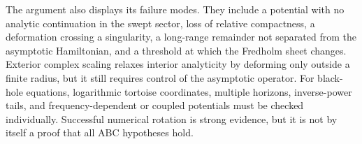 The argument also displays its failure modes.  They include a potential with
no analytic continuation in the swept sector, loss of relative compactness,
a deformation crossing a singularity, a long-range remainder not separated
from the asymptotic Hamiltonian, and a threshold at which the Fredholm sheet
changes.  Exterior complex scaling relaxes interior analyticity by deforming
only outside a finite radius, but it still requires control of the asymptotic
operator.  For black-hole equations, logarithmic tortoise coordinates,
multiple horizons, inverse-power tails, and frequency-dependent or coupled
potentials must be checked individually.  Successful numerical rotation is
strong evidence, but it is not by itself a proof that all ABC hypotheses hold.
